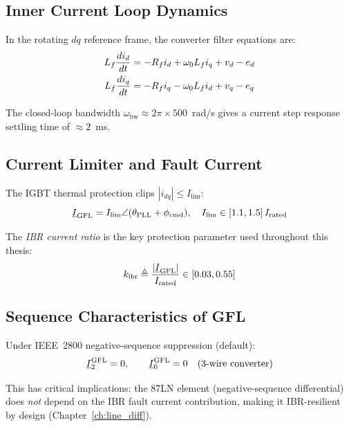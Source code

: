 \subsection{Inner Current Loop Dynamics}

In the rotating $dq$ reference frame, the converter filter equations are:
\begin{align}
  L_f \frac{di_d}{dt} &= -R_f i_d + \omega_0 L_f i_q + v_d - e_d \\
  L_f \frac{di_q}{dt} &= -R_f i_q - \omega_0 L_f i_d + v_q - e_q
\end{align}

The closed-loop bandwidth $\omega_\mathrm{bw} \approx 2\pi \times 500$~rad/s
gives a current step response settling time of $\approx 2$~ms.

\subsection{Current Limiter and Fault Current}

The IGBT thermal protection clips $|i_{dq}| \leq I_\mathrm{lim}$:
\begin{equation}
  \underline{I}_\mathrm{GFL} = I_\mathrm{lim}\angle(\theta_\mathrm{PLL} + \phi_\mathrm{cmd}),
  \quad I_\mathrm{lim} \in [1.1, 1.5]\,I_\mathrm{rated}
\end{equation}

The \emph{IBR current ratio} is the key protection parameter used throughout
this thesis:
\begin{equation}
  k_\mathrm{ibr} \triangleq \frac{|\underline{I}_\mathrm{GFL}|}{I_\mathrm{rated}}
  \in [0.03, 0.55]
  \label{eq:ch3_kibr_def}
\end{equation}

\subsection{Sequence Characteristics of GFL}

Under IEEE~2800 negative-sequence suppression (default):
\begin{equation}
  \underline{I}_2^\mathrm{GFL} = 0, \qquad
  \underline{I}_0^\mathrm{GFL} = 0 \quad \text{(3-wire converter)}
  \label{eq:ch3_gfl_seq}
\end{equation}

This has critical implications: the 87LN element (negative-sequence
differential) does \emph{not} depend on the IBR fault current contribution,
making it IBR-resilient by design (Chapter~\ref{ch:line_diff}).

